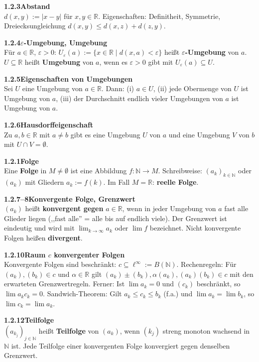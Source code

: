 \documentclass[a4paper,12pt]{article}
\newcommand{\gentry}[3]{%
  \noindent\textbf{#1\quad #2}\nopagebreak\\[0.2em]
  #3\par\smallskip
}
\begin{document}
\gentry{1.2.3}{Abstand}{%
  $d(x,y) := |x - y|$ für $x, y \in \mathbb{R}$.
  Eigenschaften: Definitheit, Symmetrie, Dreiecksungleichung
  $d(x,y) \leq d(x,z) + d(z,y)$.
}

\gentry{1.2.4}{$\varepsilon$-Umgebung, Umgebung}{%
  Für $a \in \mathbb{R}$, $\varepsilon > 0$:
  $U_\varepsilon(a) := \{x \in \mathbb{R} \mid d(x,a) < \varepsilon\}$ heißt \textbf{$\varepsilon$-Umgebung} von $a$.
  $U \subseteq \mathbb{R}$ heißt \textbf{Umgebung} von $a$, wenn es $\varepsilon > 0$ gibt mit
  $U_\varepsilon(a) \subseteq U$.
}

\gentry{1.2.5}{Eigenschaften von Umgebungen}{%
  Sei $U$ eine Umgebung von $a \in \mathbb{R}$. Dann:
  (i) $a \in U$,
  (ii) jede Obermenge von $U$ ist Umgebung von $a$,
  (iii) der Durchschnitt endlich vieler Umgebungen von $a$ ist Umgebung von $a$.
}

\gentry{1.2.6}{Hausdorffeigenschaft}{%
  Zu $a, b \in \mathbb{R}$ mit $a \neq b$ gibt es eine Umgebung $U$ von $a$ und eine
  Umgebung $V$ von $b$ mit $U \cap V = \emptyset$.
}

\gentry{1.2.1}{Folge}{%
  Eine \textbf{Folge} in $M \neq \emptyset$ ist eine Abbildung $f: \mathbb{N} \to M$.
  Schreibweise: $(a_k)_{k \in \mathbb{N}}$ oder $(a_k)$ mit Gliedern $a_k := f(k)$.
  Im Fall $M = \mathbb{R}$: \textbf{reelle Folge}.
}

\gentry{1.2.7--8}{Konvergente Folge, Grenzwert}{%
  $(a_k)$ heißt \textbf{konvergent gegen} $a \in \mathbb{R}$, wenn in jeder Umgebung von $a$
  fast alle Glieder liegen (,,fast alle'' = alle bis auf endlich viele).
  Der Grenzwert ist eindeutig und wird mit $\lim_{k \to \infty} a_k$ oder $\lim f$ bezeichnet.
  Nicht konvergente Folgen heißen \textbf{divergent}.
}

\gentry{1.2.10}{Raum $c$ konvergenter Folgen}{%
  Konvergente Folgen sind beschränkt: $c \subseteq \ell^\infty := B(\mathbb{N})$.
  Rechenregeln: Für $(a_k), (b_k) \in c$ und $\alpha \in \mathbb{R}$ gilt
  $(a_k) \pm (b_k), \alpha(a_k), (a_k)(b_k) \in c$ mit den erwarteten Grenzwertregeln.
  Ferner: Ist $\lim a_k = 0$ und $(c_k)$ beschränkt, so $\lim a_k c_k = 0$.
  Sandwich-Theorem: Gilt $a_k \leq c_k \leq b_k$ (f.a.) und $\lim a_k = \lim b_k$,
  so $\lim c_k = \lim a_k$.
}

\gentry{1.2.12}{Teilfolge}{%
  $(a_{k_j})_{j \in \mathbb{N}}$ heißt \textbf{Teilfolge} von $(a_k)$, wenn $(k_j)$ streng monoton
  wachsend in $\mathbb{N}$ ist. Jede Teilfolge einer konvergenten Folge konvergiert
  gegen denselben Grenzwert.
}
\end{document}
